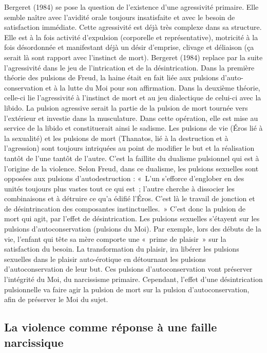 \documentclass[12pt, a4paper]{book}
\begin{document}
\begin{spacing}{1.5}
Bergeret (1984) se pose la question de l'existence d'une agressivité primaire. Elle semble naître avec l'avidité orale toujours insatisfaite et avec le besoin de satisfaction immédiate. Cette agressivité est déjà très complexe dans sa structure. Elle est à la fois activité d'expulsion (corporelle et représentative), motricité à la fois désordonnée et manifestant déjà un désir d'emprise, clivage et déliaison (ça serait là sont rapport avec l'instinct de mort). Bergeret (1984) replace par la suite l'agressivité dans le jeu de l'intrication et de la désintrication. Dans la première théorie des pulsions de Freud, la haine était en fait liée aux pulsions d'auto-conservation et à la lutte du Moi pour son affirmation. Dans la deuxième théorie, celle-ci lie l'agressivité à l'instinct de mort et au jeu dialectique de celui-ci avec la libido. La pulsion agressive serait la partie de la pulsion de mort tournée vers l'extérieur et investie dans la musculature. Dans cette opération, elle est mise au service de la libido et constituerait ainsi le sadisme. Les pulsions de vie (Éros lié à la sexualité) et les pulsions de mort (Thanatos, lié à la destruction et à l'agression) sont toujours intriquées au point de modifier le but et la réalisation tantôt de l'une tantôt de l'autre. C'est la faillite du dualisme pulsionnel qui est à l'origine de la violence.  Selon Freud, dans ce dualisme, les pulsions sexuelles sont opposées aux pulsions d'autodestruction : « L'un s'efforce d'englober en des unités toujours plus vastes tout ce qui est ; l'autre cherche à dissocier les combinaisons et à détruire ce qu'a édifié l'Éros. C'est là le travail de jonction et de désintrincation des composantes instinctuelles. » C'est donc la pulsion de mort qui agit, par l'effet de désintrication. Les pulsions sexuelles s'étayent sur les pulsions d'autoconservation (pulsions du Moi). Par exemple, lors des débuts de la vie, l'enfant qui tête sa mère comporte une « prime de plaisir » sur la satisfaction du besoin. La transformation du plaisir, ira libérer les pulsions sexuelles dans le plaisir auto-érotique en détournant les pulsions d'autoconservation de leur but. Ces pulsions d'autoconservation vont préserver l'intégrité du Moi, du narcissisme primaire. Cependant, l'effet d'une désintrication pulsionnelle va faire agir la pulsion de mort sur la pulsion d'autoconservation, afin de préserver le Moi du sujet.

\subsection{La violence comme réponse à une faille narcissique}


\end{spacing}
\end{document}
